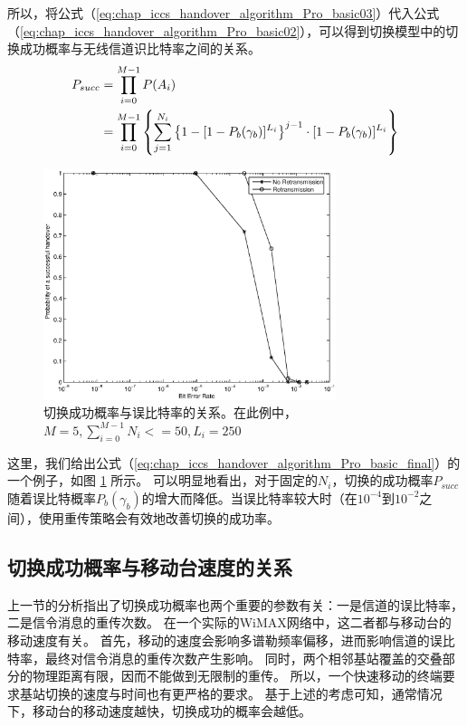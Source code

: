 所以，将公式（\ref{eq:chap_iccs_handover_algorithm_Pro_basic03}）代入公式（\ref{eq:chap_iccs_handover_algorithm_Pro_basic02}），可以得到切换模型中的切换成功概率与无线信道识比特率之间的关系。
\begin{align}
\label{eq:chap_iccs_handover_algorithm_Pro_basic_final}
\notag P_{succ}&=\prod_{i=0}^{M-1}P(A_{i})\\
&=\prod_{i=0}^{M-1}\left\{ \sum_{j=1}^{N_{i}}\left\{ 1-[1-P_{b}(\gamma_{b})]^{L_{i}}\right\} ^{j-1} \cdot[1-P_{b}(\gamma_{b})]^{L_{i}}\right\}
\end{align}
\begin{figure}[t]
\begin{centering}
\includegraphics[height=6.75cm]{iccs_ber_prob}
\par\end{centering}
\caption{切换成功概率与误比特率的关系。在此例中，$M=5,\sum_{i=0}^{M-1}N_i<=50,L_i=250$}
\label{fig:chap_iccs_handover_algorithm_PBER}
\end{figure}
这里，我们给出公式（\ref{eq:chap_iccs_handover_algorithm_Pro_basic_final}）的一个例子，如图 \ref{fig:chap_iccs_handover_algorithm_PBER} 所示。
可以明显地看出，对于固定的$N_i$，切换的成功概率$P_{succ}$随着误比特概率$P_b(\gamma_b)$的增大而降低。当误比特率较大时（在$10^{-4}$到$10^{-2}$之间），使用重传策略会有效地改善切换的成功率。

\subsection{切换成功概率与移动台速度的关系}
上一节的分析指出了切换成功概率也两个重要的参数有关：一是信道的误比特率，二是信令消息的重传次数。
在一个实际的WiMAX网络中，这二者都与移动台的移动速度有关。
首先，移动的速度会影响多谱勒频率偏移，进而影响信道的误比特率，最终对信令消息的重传次数产生影响。
同时，两个相邻基站覆盖的交叠部分的物理距离有限，因而不能做到无限制的重传。
所以，一个快速移动的终端要求基站切换的速度与时间也有更严格的要求。
基于上述的考虑可知，通常情况下，移动台的移动速度越快，切换成功的概率会越低。

